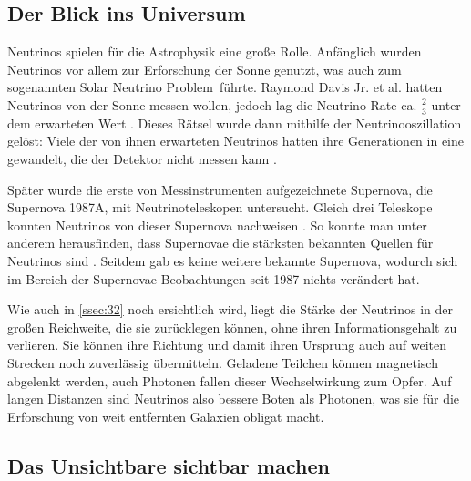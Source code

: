 \documentclass[a4paper,12pt]{article}
\begin{document}
\subsection{Der Blick ins Universum} \label{ssec:23}

Neutrinos spielen für die Astrophysik eine große Rolle. Anfänglich wurden Neutrinos vor allem zur Erforschung der Sonne genutzt, was auch zum sogenannten \glqq Solar Neutrino Problem\grqq \ führte. Raymond Davis Jr. et al. hatten Neutrinos von der Sonne messen wollen, jedoch lag die Neutrino-Rate ca. $\frac{2}{3}$ unter dem erwarteten Wert \cite[1205]{Davis1968}. Dieses Rätsel wurde dann mithilfe der Neutrinooszillation gelöst: Viele der von ihnen erwarteten Neutrinos hatten ihre Generationen in eine gewandelt, die der Detektor nicht messen kann \cite[213--214]{Suzuki2000}. \par
Später wurde die erste von Messinstrumenten aufgezeichnete Supernova, die Supernova 1987A, mit Neutrinoteleskopen untersucht. Gleich drei Teleskope konnten Neutrinos von dieser Supernova nachweisen \cite{Aglietta1987, Bionta1987, Hirata1987}. So konnte man unter anderem herausfinden, dass Supernovae die stärksten bekannten Quellen für Neutrinos sind \cite[23]{Janka2011}. Seitdem gab es keine weitere bekannte Supernova, wodurch sich im Bereich der Supernovae-Beobachtungen seit 1987 nichts verändert hat. \par
Wie auch in \cref{ssec:32} noch ersichtlich wird, liegt die Stärke der Neutrinos in der großen Reichweite, die sie zurücklegen können, ohne ihren Informationsgehalt zu verlieren. Sie können ihre Richtung und damit ihren Ursprung auch auf weiten Strecken noch zuverlässig übermitteln. Geladene Teilchen können magnetisch abgelenkt werden, auch Photonen fallen dieser Wechselwirkung zum Opfer. Auf langen Distanzen sind Neutrinos also bessere Boten als Photonen, was sie für die Erforschung von weit entfernten Galaxien obligat macht. 

\subsection{Das Unsichtbare sichtbar machen} \label{ssec:24}
\end{document}
